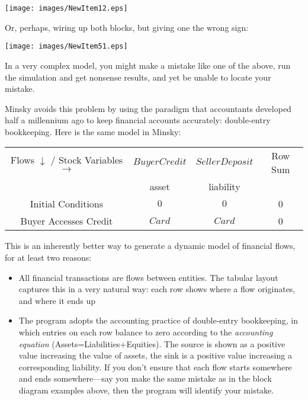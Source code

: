 \begin{center}
\texttt{[image: images/NewItem12.eps]}
\end{center}

Or, perhaps, wiring up both blocks, but giving one the wrong sign:

\begin{center}
\texttt{[image: images/NewItem51.eps]}
\end{center}

In a very complex model, you might make a mistake like one of the above, run the simulation and get nonsense results, and yet be unable to locate your mistake.


Minsky avoids this problem by using the paradigm that accountants
developed half a millennium ago to keep financial accounts accurately:
double-entry bookkeeping. Here is the same model in Minsky:

\begin{center}
\begin{tabular}{|c|cc|c|}
\hline
Flows $\downarrow$ / Stock Variables
$\rightarrow$&\multicolumn{1}{|c|}{$BuyerCredit$}&\multicolumn{1}{|c|}{$SellerDeposit$}&Row Sum\\\cline{2-3}&\multicolumn{1}{|c|}{asset}&\multicolumn{1}{|c|}{liability}&\\\hline
Initial Conditions&$0$&$0$&0\\
Buyer Accesses Credit&$Card$&$Card$&0\\
\hline
\end{tabular}
\end{center}

This is an inherently better way to generate a dynamic model of financial flows, for at least two reasons:
\begin{itemize}
\item All financial transactions are flows between entities. The
  tabular layout captures this in a very natural way: each row shows
  where a flow originates, and where it ends up
\item The program adopts the accounting practice of double-entry
  bookkeeping, in which entries on each row balance to zero according
  to the {\em accounting equation} (Assets=Liabilities+Equities). The source is
  shown as a positive value increasing the value of assets, the sink
  is a positive value increasing a corresponding liability. If you
  don't ensure that each flow starts somewhere and ends
  somewhere---say you make the same mistake as in the block diagram
  examples above, then the program will identify your mistake.
\end{itemize}

